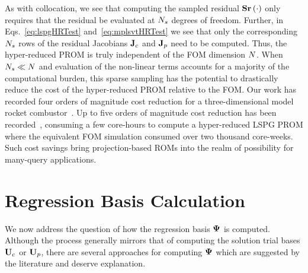 As with collocation, we see that computing the sampled residual $\mathbf{S} \mathbf{r}\left(\cdot\right)$ only requires that the residual be evaluated at $N_s$ degrees of freedom. Further, in Eqs.~\ref{eq:lspgHRTest} and~\ref{eq:mplsvtHRTest} we see that only the corresponding $N_s$ rows of the residual Jacobians $\mathbf{J}_{c} $ and $\mathbf{J}_{p}$ need to be computed. Thus, the hyper-reduced PROM is truly independent of the FOM dimension $N$. When $N_s \ll N$ and evaluation of the non-linear terms accounts for a majority of the computational burden, this sparse sampling has the potential to drastically reduce the cost of the hyper-reduced PROM relative to the FOM. Our work has recorded four orders of magnitude cost reduction for a three-dimensional model rocket combustor~\cite{Wentland2021}. Up to five orders of magnitude cost reduction has been recorded~\cite{Grimberg2021}, consuming a few core-hours to compute a hyper-reduced LSPG PROM where the equivalent FOM simulation consumed over two thousand core-weeks. Such cost savings bring projection-based ROMs into the realm of possibility for many-query applications.

\section{Regression Basis Calculation}\label{sec:regBasis}
%
We now address the question of how the regression basis $\deimBasis$ is computed. Although the process generally mirrors that of computing the solution trial bases $\consTrial$ or $\primTrial$, there are several approaches for computing $\deimBasis$ which are suggested by the literature and deserve explanation.

